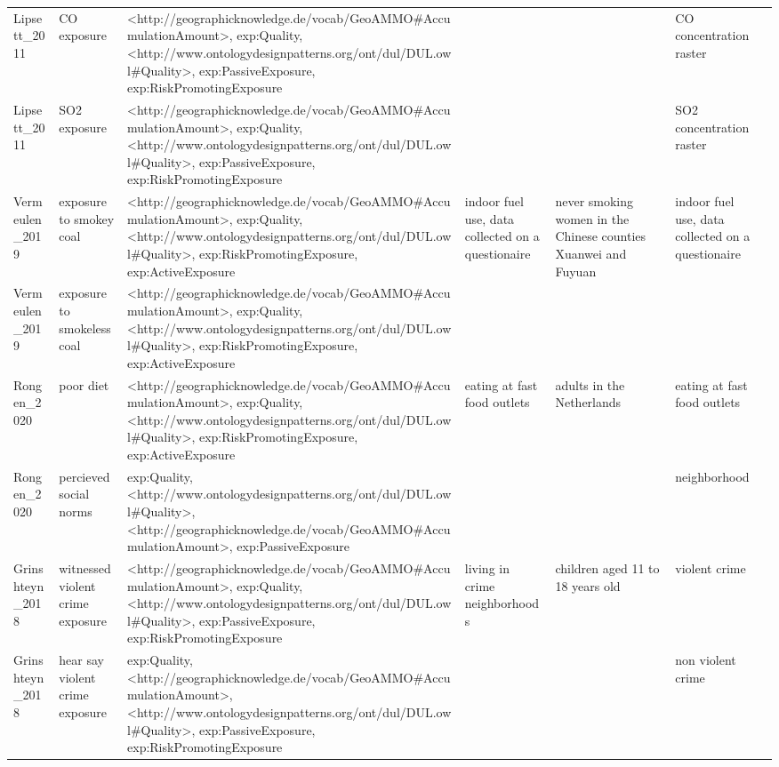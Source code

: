\begin{tabular}{p{1cm}p{1cm}p{1cm}p{1cm}p{1cm}p{1cm}p{1cm}}
Lipsett\_2011 & CO exposure & <http://geographicknowledge.de/vocab/GeoAMMO\#AccumulationAmount>, exp:Quality, <http://www.ontologydesignpatterns.org/ont/dul/DUL.owl\#Quality>, exp:PassiveExposure, exp:RiskPromotingExposure &  &  & CO concentration raster &  \\
Lipsett\_2011 & SO2 exposure & <http://geographicknowledge.de/vocab/GeoAMMO\#AccumulationAmount>, exp:Quality, <http://www.ontologydesignpatterns.org/ont/dul/DUL.owl\#Quality>, exp:PassiveExposure, exp:RiskPromotingExposure &  &  & SO2 concentration raster &  \\
Vermeulen\_2019 & exposure to smokey coal & <http://geographicknowledge.de/vocab/GeoAMMO\#AccumulationAmount>, exp:Quality, <http://www.ontologydesignpatterns.org/ont/dul/DUL.owl\#Quality>, exp:RiskPromotingExposure, exp:ActiveExposure & indoor fuel use, data collected on a questionaire & never smoking women in the Chinese counties Xuanwei and Fuyuan & indoor fuel use, data collected on a questionaire &  \\
Vermeulen\_2019 & exposure to smokeless coal & <http://geographicknowledge.de/vocab/GeoAMMO\#AccumulationAmount>, exp:Quality, <http://www.ontologydesignpatterns.org/ont/dul/DUL.owl\#Quality>, exp:RiskPromotingExposure, exp:ActiveExposure &  &  &  &  \\
Rongen\_2020 & poor diet & <http://geographicknowledge.de/vocab/GeoAMMO\#AccumulationAmount>, exp:Quality, <http://www.ontologydesignpatterns.org/ont/dul/DUL.owl\#Quality>, exp:RiskPromotingExposure, exp:ActiveExposure & eating at fast food outlets & adults in the Netherlands & eating at fast food outlets &  \\
Rongen\_2020 & percieved social norms & exp:Quality, <http://www.ontologydesignpatterns.org/ont/dul/DUL.owl\#Quality>, <http://geographicknowledge.de/vocab/GeoAMMO\#AccumulationAmount>, exp:PassiveExposure &  &  & neighborhood &  \\
Grinshteyn\_2018 & witnessed violent crime exposure & <http://geographicknowledge.de/vocab/GeoAMMO\#AccumulationAmount>, exp:Quality, <http://www.ontologydesignpatterns.org/ont/dul/DUL.owl\#Quality>, exp:PassiveExposure, exp:RiskPromotingExposure & living in crime neighborhoods & children aged 11 to 18 years old & violent crime &  \\
Grinshteyn\_2018 & hear say violent crime exposure & exp:Quality, <http://geographicknowledge.de/vocab/GeoAMMO\#AccumulationAmount>, <http://www.ontologydesignpatterns.org/ont/dul/DUL.owl\#Quality>, exp:PassiveExposure, exp:RiskPromotingExposure &  &  & non violent crime &  \\

\end{tabular}
